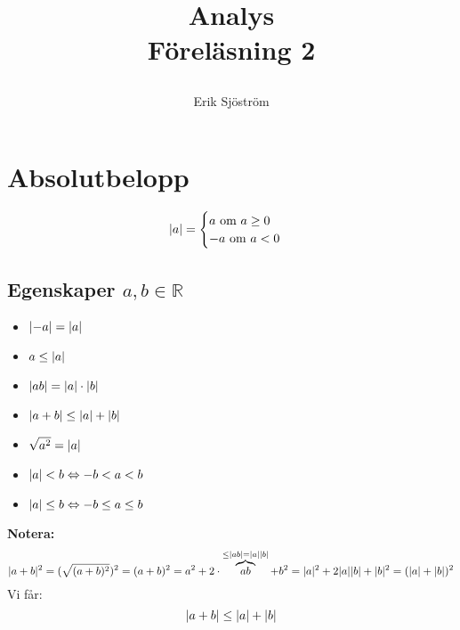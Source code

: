 

\title{
     Analys\\
     Föreläsning 2
    \author{Erik Sjöström}
}

\maketitle

\section{Absolutbelopp} %
\label{sec:absolutbelopp}

\begin{Def}
    \[
    \lvert a\rvert =
    \begin{cases}
        a \mbox{ om } a \ge 0\\
        -a \mbox{ om } a < 0
    \end{cases}
    \]
\end{Def}
\subsection{Egenskaper $a,b \in \mathbb{R}$} %
\label{sub:egenskaper}
\begin{itemize}
    \item $\lvert-a\rvert = \lvert a\rvert$
    \item $a \le \lvert a\rvert$
    \item $\lvert ab\rvert = \lvert a\rvert \cdot \lvert b\rvert$
    \item $\lvert a + b\rvert \le \lvert a\rvert + \lvert b\rvert$
    \item $\sqrt{a^2} = \lvert a\rvert$
    \item $\lvert a\rvert < b \Leftrightarrow -b < a < b$
    \item $\lvert a\rvert \le b \Leftrightarrow -b \le a \le b$
\end{itemize}
\textbf{Notera:}
\[
\lvert a + b\rvert^2 = (\sqrt{(a + b)^2})^2 = (a + b)^2 = a^2 + 2 \cdot \overbrace{ab}^{\le \lvert ab\rvert = \lvert a\rvert\lvert b\rvert} + b^2 = \lvert a\rvert^2 + 2 \lvert a\rvert\lvert b\rvert + \lvert b\rvert^2 = (\lvert a\rvert + \lvert b\rvert)^2
\]
Vi får:
\[
\lvert a + b\rvert \le \lvert a\rvert + \lvert b\rvert
\]

